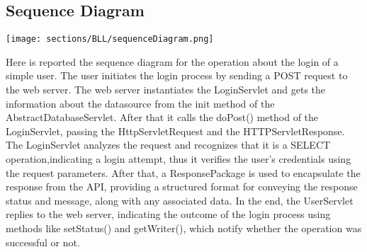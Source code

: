 \subsection{Sequence Diagram}

\texttt{[image: sections/BLL/sequenceDiagram.png]}
\newpage

Here is reported the sequence diagram for the operation about the login of a simple user. The user initiates the login process by sending a POST request to the web server.
The web server instantiates the LoginServlet and gets the
information about the datasource from the init method of the AbstractDatabaseServlet. 
After that it calls the doPost() method of the LoginServlet, passing the HttpServletRequest and the HTTPServletResponse. 
The LoginServlet analyzes the request and recognizes that it is a SELECT operation,indicating a login attempt, thus it
verifies the user's credentials using the request parameters. 
After that, a ResponsePackage is used to encapsulate the response from the API, providing a structured format for conveying the response status and message, along with any associated data.
In the end, the UserServlet replies to the web server, indicating the outcome of the login process using methods like setStatus() and getWriter(), which notify whether the operation was successful or not.
\newpage
